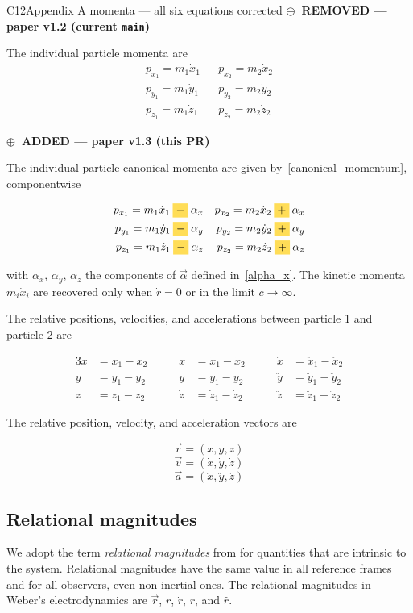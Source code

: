 \documentclass[12pt,a4paper]{article}
\theoremstyle{definition}
\theoremstyle{remark}
\newcommand{\oldtag}{{\sffamily\bfseries\footnotesize
  \textcolor{oldink}{$\ominus$~REMOVED \textnormal{\textmd{— paper v1.2 (current \texttt{main})}}}}\par\smallskip}
\newcommand{\newtag}{{\sffamily\bfseries\footnotesize
  \textcolor{newink}{$\oplus$~ADDED \textnormal{\textmd{— paper v1.3 (this PR)}}}}\par\smallskip}
\newcommand{\sgn}[1]{\mathbin{\colorbox{sigbg}{$#1$}}}
\newcommand{\eqnote}[1]{\par\smallskip{\footnotesize\sffamily\textcolor{barink}{#1}}\par}
\begin{document}
\begin{diffbox}{C12}{Appendix A momenta --- all six equations corrected}
\oldtag
The individual particle momenta are
\begin{align*}
    p_{x_1} = m_1 \dot{x}_1 &  & p_{x_2} = m_2 \dot{x}_2 \\
    p_{y_1} = m_1 \dot{y}_1 &  & p_{y_2} = m_2 \dot{y}_2 \\
    p_{z_1} = m_1 \dot{z}_1 &  & p_{z_2} = m_2 \dot{z}_2
\end{align*}
\eqnote{The notation appendix stated the error as a definition, which is why it
propagated so cleanly through the rest of the paper.}
\tcblower
\newtag
The individual particle canonical momenta are given by~\eqref{canonical_momentum}, componentwise

\begin{align*}
    p_{x_1} = m_1 \dot{x}_1 \sgn{-} \alpha_x &  & p_{x_2} = m_2 \dot{x}_2 \sgn{+} \alpha_x \\
    p_{y_1} = m_1 \dot{y}_1 \sgn{-} \alpha_y &  & p_{y_2} = m_2 \dot{y}_2 \sgn{+} \alpha_y \\
    p_{z_1} = m_1 \dot{z}_1 \sgn{-} \alpha_z &  & p_{z_2} = m_2 \dot{z}_2 \sgn{+} \alpha_z
\end{align*}

with $\alpha_x$, $\alpha_y$, $\alpha_z$ the components of $\vec{\alpha}$ defined in~\eqref{alpha_x}. The kinetic momenta $m_i \dot{x}_i$ are recovered only when $\dot{r} = 0$ or in the limit $c \to \infty$.
\end{diffbox}

The relative positions, velocities, and accelerations between particle 1 and particle 2 are

\begin{alignat*}{3}
    x & = x_1 - x_2 \qquad & \dot{x} & = \dot{x}_1 - \dot{x}_2 \qquad & \ddot{x} & = \ddot{x}_1 - \ddot{x}_2 \\
    y & = y_1 - y_2 \qquad & \dot{y} & = \dot{y}_1 - \dot{y}_2 \qquad & \ddot{y} & = \ddot{y}_1 - \ddot{y}_2 \\
    z & = z_1 - z_2 \qquad & \dot{z} & = \dot{z}_1 - \dot{z}_2 \qquad & \ddot{z} & = \ddot{z}_1 - \ddot{z}_2
\end{alignat*}

The relative position, velocity, and acceleration vectors are

\[\vec{r} = (x, y, z)\]
\[\vec{v} = (\dot{x}, \dot{y}, \dot{z})\]
\[\vec{a} = (\ddot{x}, \ddot{y}, \ddot{z})\]

\subsection{Relational magnitudes}\label{app:additional-remarks}
We adopt the term \textit{relational magnitudes} from \citep{assis-relational-mechanics} for quantities that are intrinsic to the system. Relational magnitudes have the same value in all reference frames and for all observers, even non-inertial ones. The relational magnitudes in Weber's electrodynamics are $\vec{r}$, $r$, $\dot{r}$, $\ddot{r}$, and $\hat{r}$.
\end{document}

